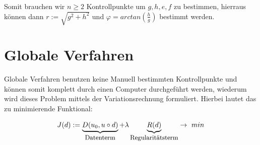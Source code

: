 Somit brauchen wir $n \geq 2$ Kontrollpunkte um $g,h,e,f$ zu bestimmen, hierraus können dann $r:=\sqrt{g^2+h^2}$ und $\varphi=arctan(\frac{h}{g})$ bestimmt werden.

\section{Globale Verfahren}

Globale Verfahren benutzen keine Manuell bestimmten Kontrollpunkte und können somit komplett durch einen Computer durchgeführt werden, wiederum wird dieses Problem mittels der Variationsrechnung formuliert.
Hierbei lautet das zu minimierende Funktional:

\[J(d):=\underbrace{D(u_0,u \circ d)}_{\text{\small Datenterm}} + \lambda \underbrace{R(d)}_{\text{\small Regularitätsterm}} \to \ min\]

